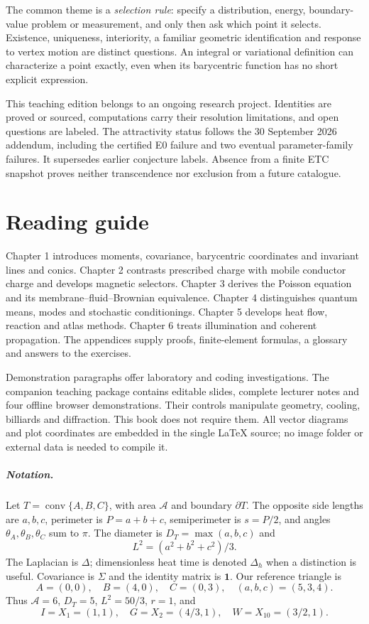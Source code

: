\documentclass[11pt,oneside,openany]{book}
\begin{document}
The common theme is a \emph{selection rule}: specify a distribution,
energy, boundary-value problem or measurement, and only then ask which
point it selects. Existence, uniqueness, interiority, a familiar geometric
identification and response to vertex motion are distinct questions.
An integral or variational definition can characterize a point exactly,
even when its barycentric function has no short explicit expression.

This teaching edition belongs to an ongoing research project. Identities
are proved or sourced, computations carry their resolution limitations,
and open questions are labeled. The attractivity status follows the
30 September 2026 addendum, including the certified E0 failure and two
eventual parameter-family failures. It supersedes earlier conjecture
labels. Absence from a finite ETC snapshot proves neither transcendence
nor exclusion from a future catalogue.

\chapter*{Reading guide}
\begingroup\small
Chapter 1 introduces moments, covariance, barycentric coordinates and
invariant lines and conics. Chapter 2 contrasts prescribed charge with
mobile conductor charge and develops magnetic selectors. Chapter 3
derives the Poisson equation and its membrane--fluid--Brownian equivalence.
Chapter 4 distinguishes quantum means, modes and stochastic conditionings.
Chapter 5 develops heat flow, reaction and atlas methods. Chapter 6 treats
illumination and coherent propagation. The appendices supply proofs,
finite-element formulas, a glossary and answers to the exercises.

Demonstration paragraphs offer laboratory and coding investigations.
The companion teaching package contains editable slides, complete
lecturer notes and four offline browser demonstrations. Their controls
manipulate geometry, cooling, billiards and diffraction. This book does
not require them. All vector diagrams and plot coordinates are embedded
in the single LaTeX source; no image folder or external data is needed
to compile it.

\paragraph{Notation.}
Let $T=\operatorname{conv}\{A,B,C\}$, with area $\mathcal A$ and boundary
$\partial T$. The opposite side lengths are $a,b,c$, perimeter is
$P=a+b+c$, semiperimeter is $s=P/2$, and angles
$\theta_A,\theta_B,\theta_C$ sum to $\pi$.
The diameter is $D_T=\max(a,b,c)$ and
\[
L^2=(a^2+b^2+c^2)/3.
\]
The Laplacian is $\Delta$; dimensionless heat time is denoted $\Delta_h$
when a distinction is useful. Covariance is $\Sigma$ and the identity
matrix is $\mathbf1$. Our reference triangle is
\[
A=(0,0),\quad B=(4,0),\quad C=(0,3),\quad(a,b,c)=(5,3,4).
\]
Thus $\mathcal A=6$, $D_T=5$, $L^2=50/3$, $r=1$, and
\[
I=X_1=(1,1),\quad G=X_2=(4/3,1),\quad W=X_{10}=(3/2,1).
\]
\end{document}
